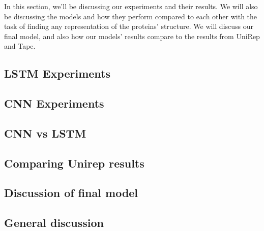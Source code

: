 In this section, we'll be discussing our experiments and their results. We will also be discussing the models and how they perform compared to each other with the task of finding any representation of the proteins' structure. We will discuss our final model, and also how our models' results compare to the results from UniRep\cite{unirep} and Tape\cite{tape}.

\subsection{LSTM Experiments}


\subsection{CNN Experiments}


\subsection{CNN vs LSTM}


\subsection{Comparing Unirep results}


\subsection{Discussion of final model}


\subsection{General discussion}
